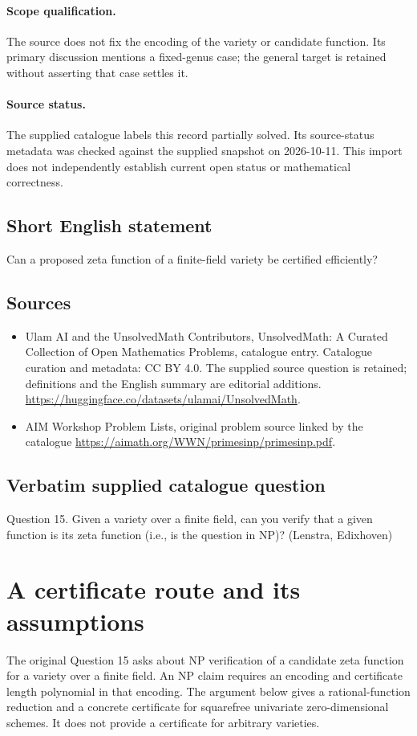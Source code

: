 \documentclass[11pt]{article}
\begin{document}
\paragraph{Scope qualification.}
The source does not fix the encoding of the variety or candidate function. Its primary discussion mentions a fixed-genus case; the general target is retained without asserting that case settles it.
\paragraph{Source status.}
The supplied catalogue labels this record partially solved. Its source-status metadata was checked against the supplied snapshot on 2026-10-11. This import does not independently establish current open status or mathematical correctness.
\subsection{Short English statement}
Can a proposed zeta function of a finite-field variety be certified efficiently?
\subsection{Sources}
\begin{itemize}
\item[S1] Ulam AI and the UnsolvedMath Contributors, UnsolvedMath: A Curated Collection of Open Mathematics Problems, catalogue entry. Catalogue curation and metadata: CC BY 4.0. The supplied source question is retained; definitions and the English summary are editorial additions.
\url{https://huggingface.co/datasets/ulamai/UnsolvedMath}.
\item[S2] AIM Workshop Problem Lists, original problem source linked by the catalogue
\url{https://aimath.org/WWN/primesinp/primesinp.pdf}.
\end{itemize}
\subsection{Verbatim supplied catalogue question}
Question 15. Given a variety over a finite field, can you verify that a given function is its zeta function (i.e., is the question in NP)? (Lenstra, Edixhoven)

\section{A certificate route and its assumptions}
The original Question 15 asks about NP verification of a candidate
zeta function for a variety over a finite field. An NP claim requires
an encoding and certificate length polynomial in that encoding. The
argument below gives a rational-function reduction and a concrete
certificate for squarefree univariate zero-dimensional schemes. It
does not provide a certificate for arbitrary varieties.
\end{document}
